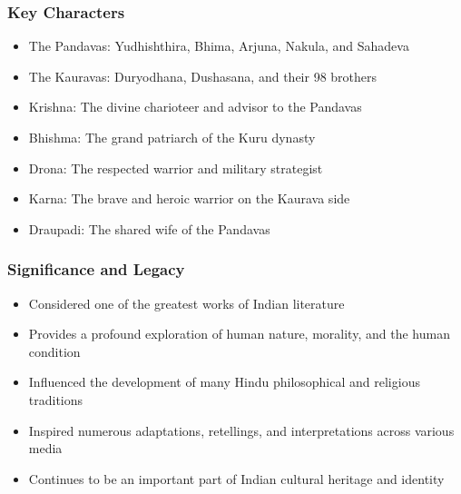 \begin{frame}[fragile]\frametitle{Key Characters}
    \begin{itemize}
        \item The Pandavas: Yudhishthira, Bhima, Arjuna, Nakula, and Sahadeva
        \item The Kauravas: Duryodhana, Dushasana, and their 98 brothers
        \item Krishna: The divine charioteer and advisor to the Pandavas
        \item Bhishma: The grand patriarch of the Kuru dynasty
        \item Drona: The respected warrior and military strategist
        \item Karna: The brave and heroic warrior on the Kaurava side
        \item Draupadi: The shared wife of the Pandavas
    \end{itemize}
\end{frame}

\begin{frame}[fragile]\frametitle{Significance and Legacy}
    \begin{itemize}
        \item Considered one of the greatest works of Indian literature
        \item Provides a profound exploration of human nature, morality, and the human condition
        \item Influenced the development of many Hindu philosophical and religious traditions
        \item Inspired numerous adaptations, retellings, and interpretations across various media
        \item Continues to be an important part of Indian cultural heritage and identity
    \end{itemize}
\end{frame}
